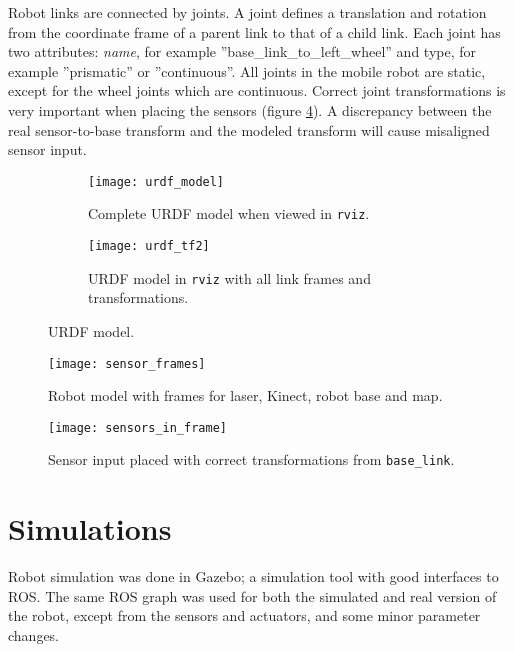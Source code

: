 Robot links are connected by joints. A joint defines a translation and rotation from the coordinate frame of a parent link to that of a child link. Each joint has two attributes: \textit{name}, for example ''base\_link\_to\_left\_wheel'' and type, for example ''prismatic'' or ''continuous''. All joints in the mobile robot are static, except for the wheel joints which are continuous. Correct joint transformations is very important when placing the sensors (figure \ref{fig:sensor_frames}). A discrepancy between the real sensor-to-base transform and the modeled transform will cause misaligned sensor input.

 \begin{figure}[h]
 	\centering
 	\begin{subfigure}[b]{0.402\textwidth}
 		\texttt{[image: urdf\_model]}
 		\caption{Complete \ac{URDF} model when viewed in \texttt{rviz}.}
 		\label{fig:urdf_model}
 	\end{subfigure}
 	\begin{subfigure}[b]{0.51\textwidth}
 		
 		\texttt{[image: urdf\_tf2]}
 		\caption{\ac{URDF} model in \texttt{rviz} with all link frames and transformations.}
 		\label{fig:urdf_tf}
 	\end{subfigure}
 	\caption{\ac{URDF} model.}
 \end{figure}

\begin{figure}[h]
	\centering
	\texttt{[image: sensor\_frames]}
	\caption{Robot model with frames for laser, Kinect, robot base and map. }
	\label{fig:sensor_frames}
\end{figure}

\begin{figure}[h]
	\centering
	\texttt{[image: sensors\_in\_frame]}
	\caption{Sensor input placed with correct transformations from \texttt{base\_link}. }
	\label{fig:sensors_in_frame}
\end{figure}


\section{Simulations}
\label{sec:simulations}
Robot simulation was done in Gazebo; a simulation tool with good interfaces to \ac{ROS}. The same \ac{ROS} graph was used for both the simulated and real version of the robot, except from the sensors and actuators, and some minor parameter changes. 

